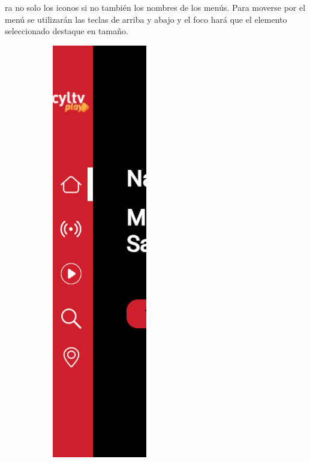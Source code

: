 ra no solo los iconos si no también los nombres de los menús. Para moverse por el menú se utilizarán las teclas de 
arriba y abajo y el foco hará que el elemento seleccionado destaque en tamaño. 

\begin{figure}[H]
    \centering
    \begin{subfigure}[c]{0.1\textwidth} 
        \includegraphics[width=\textwidth]{imaxes/OTT/menu_lateral_cerrado.png}

\end{subfigure}
\end{figure}
